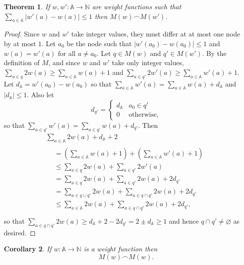 \documentclass[journal]{IEEEtran}
\newtheorem{theorem}{Theorem}
\newtheorem{corollary}[theorem]{Corollary}
\begin{document}
\begin{theorem} \label{weights-nearly-equal} If $w, w' : \mathbb A \to \mathbb
N$ are weight functions such that $\sum_{a \in \mathbb A} |w'(a) - w(a)| \le 1$
then $M(w) \frown M(w')$.  \end{theorem}

\begin{proof}Since $w$ and $w'$ take integer values, they must differ at at
most one node by at most $1$. Let $a_0$ be the node such that $|w'(a_0) -
w(a_0)| \le 1$ and $w(a) = w'(a)$ for all $a \ne a_0$.
%
Let $q \in M(w)$ and $q' \in M(w')$. By the definition of $M$, and since $w$
and $w'$ take only integer values,
%
$\sum_{a \in q} 2 w(a) \ge \sum_{a \in \mathbb A} w(a) + 1$
%
and
%
$\sum_{a \in q'} 2 w'(a) \ge \sum_{a \in \mathbb A} w'(a) + 1$.
%
Let $d_{\mathbb A} = w'(a_0) - w(a_0)$ so that $\sum_{a \in \mathbb A} w'(a) =
\sum_{a \in \mathbb A} w(a) + d_{\mathbb A}$ and $|d_\mathbb A| \le 1$. Also
let \[ d_{q'} =
\begin{cases}
%
d_{\mathbb A} & a_0 \in q' \\
%
0 & \textrm{otherwise,}
%
\end{cases}
\]
so that $\sum_{a \in q'} w'(a) = \sum_{a \in q'} w(a) + d_{q'}$.
%
Then
\begin{gather*}
%
\sum_{a \in \mathbb A} 2w(a) + d_{\mathbb A} + 2 \\
%
\begin{aligned}
%
&= \left( \sum_{a \in \mathbb A} w(a)  + 1\right)
+  \left( \sum_{a \in \mathbb A} w'(a) + 1\right) \\
%
&\le \sum_{a \in q}  2w(a)
+    \sum_{a \in q'} 2w'(a) \\
%
&= \sum_{a \in q}  2w(a)
+  \sum_{a \in q'} 2w(a) + 2d_{q'}\\
%
&= \sum_{a \in q \cup q'} 2w(a)
+  \sum_{a \in q \cap q'} 2w(a) + 2d_{q'}\\
%
&\le \sum_{a \in \mathbb A} 2w(a)
+    \sum_{a \in q \cap q'} 2w(a) + 2d_{q'},\\
%
\end{aligned}\end{gather*} so that $\sum_{a \in q \cap q'} 2w(a) \ge d_{\mathbb
A} + 2 - 2d_{q'} = 2 \pm d_\mathbb A \ge 1$ and hence $q \cap q' \ne
\varnothing$ as desired.  \end{proof}

\begin{corollary} \label{weights-equal} If $w : \mathbb A \to \mathbb N$ is a
weight function then \[M(w) \frown M(w).\]  \end{corollary}
\end{document}

